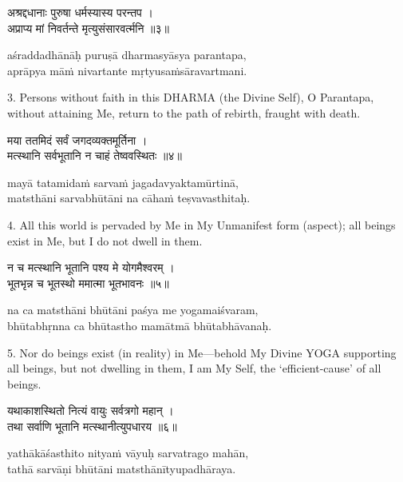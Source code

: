 \begin{gitaverse}
अश्रद्दधानाः पुरुषा धर्मस्यास्य परन्तप । \\
अप्राप्य मां निवर्तन्ते मृत्युसंसारवर्त्मनि ॥३॥
\end{gitaverse}

\begin{transliteration}
aśraddadhānāḥ puruṣā dharmasyāsya parantapa, \\
aprāpya māṁ nivartante mṛtyusaṁsāravartmani.
\end{transliteration}

3. Persons without faith in this DHARMA (the Divine Self), O Parantapa, without
attaining Me, return to the path of rebirth, fraught with death.

\begin{gitaverse}
मया ततमिदं सर्वं जगदव्यक्तमूर्तिना । \\
मत्स्थानि सर्वभूतानि न चाहं तेष्ववस्थितः ॥४॥
\end{gitaverse}

\begin{transliteration}
mayā tatamidaṁ sarvaṁ jagadavyaktamūrtinā, \\
matsthāni sarvabhūtāni na cāhaṁ teṣvavasthitaḥ.
\end{transliteration}

4. All this world is pervaded by Me in My Unmanifest form (aspect); all beings
exist in Me, but I do not dwell in them.

\begin{gitaverse}
न च मत्स्थानि भूतानि पश्य मे योगमैश्वरम् । \\
भूतभृन्न च भूतस्थो ममात्मा भूतभावनः ॥५॥
\end{gitaverse}

\begin{transliteration}
na ca matsthāni bhūtāni paśya me yogamaiśvaram, \\
bhūtabhṛnna ca bhūtastho mamātmā bhūtabhāvanaḥ.
\end{transliteration}

5. Nor do beings exist (in reality) in Me---behold My Divine YOGA supporting
all beings, but not dwelling in them, I am My Self, the `efficient-cause' of
all beings.

\begin{gitaverse}
यथाकाशस्थितो नित्यं वायुः सर्वत्रगो महान् । \\
तथा सर्वाणि भूतानि मत्स्थानीत्युपधारय ॥६॥
\end{gitaverse}

\begin{transliteration}
yathākāśasthito nityaṁ vāyuḥ sarvatrago mahān, \\
tathā sarvāṇi bhūtāni matsthānītyupadhāraya.
\end{transliteration}

